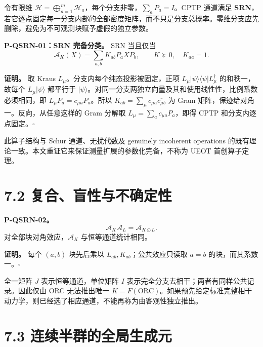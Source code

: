 \documentclass[
  11pt,
  oneside]{book}
\begin{document}
令有限维
\(\mathcal H=\bigoplus_{a=1}^m\mathcal H_a\)，每个分支非零，\(\sum_aP_a=I\)。CPTP
通道满足
\textbf{SRN}，若它逐点固定每一分支内部的全部密度矩阵，而不只是分支总概率。零维分支应先删除，避免为不可观测块赋予虚假的独立参数。

\protect\hypertarget{p-qsrn-01}{}{}

\textbf{P-QSRN-01：SRN 完备分类。} SRN 当且仅当 \[
\mathcal A_K(X)=\sum_{a,b}K_{ab}P_aXP_b,\qquad
K\succeq0,\quad K_{aa}=1.
\]

\textbf{证明。} 取 Kraus \(L_\mu\)。分支内每个纯态投影被固定，正项
\(L_\mu|\psi\rangle\langle\psi|L_\mu^\dagger\) 的和秩一，故每个
\(L_\mu|\psi\rangle\) 都平行于
\(|\psi\rangle\)。对同一分支两独立向量及其和使用线性性，比例系数必须相同，即
\(L_\mu P_a=c_{\mu a}P_a\)。所以
\(K_{ab}=\sum_\mu c_{\mu a}\overline{c_{\mu b}}\) 为 Gram
矩阵，保迹给对角一。反向，从任意这样的 Gram 分解取
\(L_\mu=\sum_ac_{\mu a}P_a\)，即得 CPTP 和分支内逐点固定。\(\square\)

此算子结构与 Schur 通道、无扰代数及 genuinely incoherent operations
的既有理论一致。本文重证它来保证测量扩展的参数化完备，不称为 UEOT
首创算子定理。

\hypertarget{ux590dux5408ux76f2ux6027ux4e0eux4e0dux786eux5b9aux6027}{%
\section{7.2
复合、盲性与不确定性}\label{ux590dux5408ux76f2ux6027ux4e0eux4e0dux786eux5b9aux6027}}

\protect\hypertarget{p-qsrn-02}{}{}

\textbf{P-QSRN-02。} \[
\mathcal A_K\mathcal A_L=\mathcal A_{K\odot L}.
\] 对全部块对角效应，\(\mathcal A_K\) 与恒等通道统计相同。

\textbf{证明。} 每个 \((a,b)\) 块先后乘以
\(L_{ab},K_{ab}\)；公共效应只读取 \(a=b\) 的块，而其系数一。\(\square\)

全一矩阵 \(J\) 表示恒等通道，单位矩阵 \(I\)
表示完全分支去相干；两者有同样公共记录。因此仅由 ORC 无法推出唯一
\(K=F(\mathrm{ORC})\)。如果预先给定标准完整相干动力学，则已经选了相应通道，不能再称为由客观性独立推出。

\hypertarget{ux8fdeux7eedux534aux7fa4ux7684ux5168ux5c40ux751fux6210ux5143}{%
\section{7.3
连续半群的全局生成元}\label{ux8fdeux7eedux534aux7fa4ux7684ux5168ux5c40ux751fux6210ux5143}}
\end{document}
